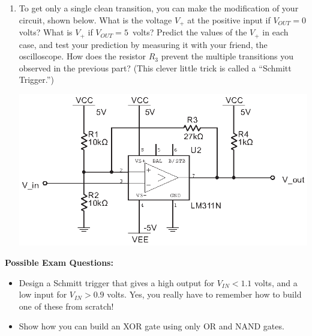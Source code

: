 \begin{enumerate}[wide]
\item To get only a single clean transition, you can make the modification of your circuit, shown below.  What is the voltage $V_+$ at the positive input if $V_{OUT}=0$ volts?  What is $V_+$ if $V_{OUT}=5$~volts?   Predict the values of the $V_+$ in each case, and test your prediction by measuring it with your friend, the oscilloscope.  How does the resistor $R_3$ prevent the multiple transitions you observed in the previous part?  (This clever little trick is called a ``Schmitt Trigger.'')

\begin{center}
\includegraphics{digital_electronics/schmitt_trigger.eps}
\end{center}


\end{enumerate}


\textbf{Possible Exam Questions:}

\begin{itemize}

\item Design a Schmitt trigger that gives a high output for $V_{IN}<1.1$ volts, and a low input for $V_{IN}>0.9$ volts.  Yes, you really have to remember how to build one of these from scratch!

\item Show how you can build an XOR gate using only OR and NAND gates.
\end{itemize}







